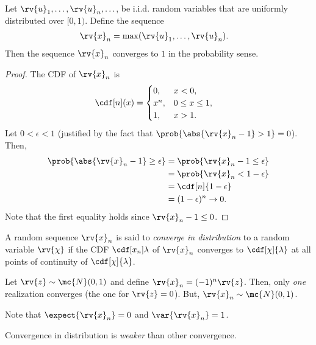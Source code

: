 \begin{example}
    Let $\rv{u}_{1},\ldots, \rv{u}_{n}, \ldots$, be i.i.d. random variables that are uniformly distributed over $[0, 1)$. Define the sequence
    \begin{align}
        \rv{x}_{n} &= \max (\rv{u}_{1},\ldots, \rv{u}_{n}).
    \end{align}
    Then the sequence $\rv{x}_{n}$ converges to $1$ in the probability sense.
    \begin{proof}
        The CDF of $\rv{x}_{n}$ is
        \begin{align}
            \cdf[n](x) &= 
            \begin{cases}
                0, & x<0,\\
                x^{n}, & 0\leq x\leq 1,\\
                1, & x>1.
            \end{cases}
        \end{align}
        Let $0<\epsilon<1$ (justified by the fact that $\prob{\abs{\rv{x}_{n} - 1}>1}=0$). Then,
        \begin{align}
            \prob{\abs{\rv{x}_{n} - 1} \geq \epsilon} &= 
            \prob{\rv{x}_{n} - 1 \leq \epsilon}\\
            &= \prob{\rv{x}_{n} < 1 - \epsilon}\\
            &= \cdf[n]{1-\epsilon}\\
            &= (1-\epsilon)^{n} \to 0.
        \end{align}
        Note that the first equality holds since $\rv{x}_{n} - 1 \leq 0$.
    \end{proof}
\end{example}

\begin{definitionBox}
  A random sequence $\rv{x}_{n}$ is said to \emph{converge in distribution} to a random variable $\rv{\chi}$ if the CDF $\cdf[x_{n}]{\lambda}$ of $\rv{x}_{n}$ converges to $\cdf[\chi]{\lambda}$ at all points of continuity of $\cdf[\chi]{\lambda}$.
\end{definitionBox}

\begin{example}
        Let $\rv{z}\sim \mc{N}(0, 1)$ and define $\rv{x}_{n} = (-1)^{n}\rv{z}$. Then, only \emph{one} realization converges (the one for $\rv{z}=0$). But, $\rv{x}_{n}\sim\mc{N}(0,1)$.

        Note that $\expect{\rv{x}_{n}} = 0$ and $\var{\rv{x}_{n}} = 1$.
\end{example}
\begin{remarkBox}
    Convergence in distribution is \emph{weaker} than other convergence.
\end{remarkBox}


